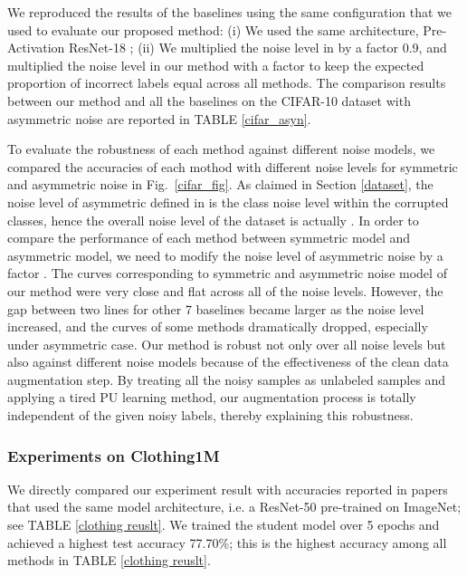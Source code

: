 \documentclass[conference]{IEEEtran}
\begin{document}
\begin{algorithm}[H]
We reproduced the results of the baselines \cite{tanaka2018joint,arazo2019unsupervised,zhang2017mixup,han2018co,wei2020combating, li2020dividemix} using the same configuration that we used to evaluate our proposed method: 
(i) We used the same architecture, Pre-Activation ResNet-18 \cite{he2016identity}; 
(ii) We multiplied the noise level in \cite{han2018co, wei2020combating} by a factor 0.9, and multiplied the noise level in our method with a factor  to keep the expected proportion of incorrect labels equal across all methods. 
The comparison results between our method and all the baselines on the CIFAR-10 dataset with asymmetric noise are reported in TABLE \ref{cifar_asyn}.

To evaluate the robustness of each method against different noise models, we compared the accuracies of each mothod with different noise levels for symmetric and asymmetric noise in \mbox{Fig. \ref{cifar_fig}}. As claimed in Section \ref{dataset}, the noise level of asymmetric defined in \cite{patrini2017making} is the class noise level within the corrupted classes, hence the overall noise level of the dataset is actually . In order to compare the performance of each method between symmetric model and asymmetric model, we need to modify the noise level of asymmetric noise by a factor . The curves corresponding to symmetric and asymmetric noise model of our method were very close and flat across all of the noise levels. However, the gap between two lines for other 7 baselines became larger as the noise level increased, and the curves of some methods dramatically dropped, especially under asymmetric case. Our method is robust not only over all noise levels but also against different noise models because of the effectiveness of the clean data augmentation step. By treating all the noisy samples as unlabeled samples and applying a tired PU learning method, our augmentation process is totally independent of the given noisy labels, thereby explaining this robustness. 




\subsubsection{Experiments on Clothing1M}


We directly compared our experiment result with accuracies reported in papers that used the same model architecture, i.e. a ResNet-50 \cite{he2016identity} pre-trained on ImageNet; see TABLE \ref{clothing reuslt}. 
We trained the student model over 5 epochs and achieved a highest test accuracy 77.70\%; this is the highest accuracy among all methods in TABLE \ref{clothing reuslt}.



\end{algorithm}
\end{document}
